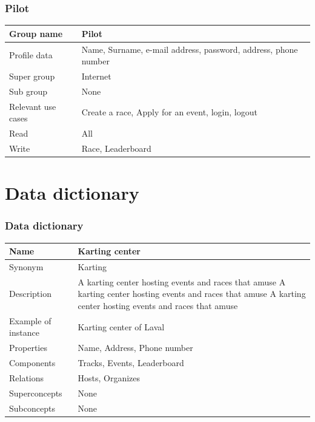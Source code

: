 \documentclass{beamer}
\begin{document}
\begin{frame}
\frametitle{Pilot}

\begin{table}
    \tiny
    \begin{tabular}{|p{2cm}|p{6cm}|}
    \hline
    Group name & \textbf{Pilot} \\
    \hline
    Profile data & Name, Surname, e-mail address, password, address, phone number \\
    \hline
    Super group & Internet \\
    \hline
    Sub group & None \\
    \hline
    Relevant use cases & Create a race, Apply for an event, 
    login, logout \\
    \hline
    Read & All \\
    \hline
    Write & Race, Leaderboard \\
    \hline
    \end{tabular}
    \end{table}

\end{frame}


\section*{Data dictionary}
\begin{frame}
\frametitle{Data dictionary}


\begin{table}
\tiny
\begin{tabular}{|p{2cm}|p{6cm}|}
\hline
Name & \textbf{Karting center} \\
\hline
Synonym & Karting \\
\hline
Description & A karting center hosting events and races that amuse
A karting center hosting events and races that amuse
A karting center hosting events and races that amuse\\
\hline
Example of instance & Karting center of Laval\\
\hline
Properties & 
Name,
Address, 
Phone number \\
\hline
Components &
Tracks,
Events,
Leaderboard \\
\hline
Relations &
Hosts, 
Organizes \\
\hline
Superconcepts & None \\
\hline
Subconcepts & None \\
\hline
\end{tabular}
\end{table}

\end{frame}

\end{document}
